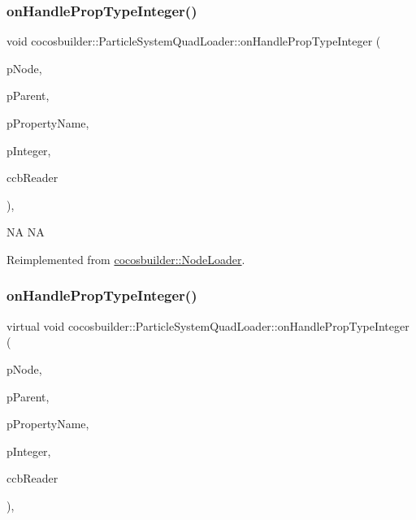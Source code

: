 \subsubsection{\texorpdfstring{on\+Handle\+Prop\+Type\+Integer()}{onHandlePropTypeInteger()}\hspace{0.1cm}{\footnotesize\ttfamily [1/2]}}
{\footnotesize\ttfamily void cocosbuilder\+::\+Particle\+System\+Quad\+Loader\+::on\+Handle\+Prop\+Type\+Integer (\begin{DoxyParamCaption}\item[{cocos2d\+::\+Node $\ast$}]{p\+Node,  }\item[{cocos2d\+::\+Node $\ast$}]{p\+Parent,  }\item[{const char $\ast$}]{p\+Property\+Name,  }\item[{int}]{p\+Integer,  }\item[{\hyperlink{classcocosbuilder_1_1CCBReader}{C\+C\+B\+Reader} $\ast$}]{ccb\+Reader }\end{DoxyParamCaption})\hspace{0.3cm}{\ttfamily [protected]}, {\ttfamily [virtual]}}

NA  NA 

Reimplemented from \hyperlink{classcocosbuilder_1_1NodeLoader}{cocosbuilder\+::\+Node\+Loader}.

\mbox{\label{classcocosbuilder_1_1ParticleSystemQuadLoader_a250882ee759f89e1211db8bab109fbc9}} 
\subsubsection{\texorpdfstring{on\+Handle\+Prop\+Type\+Integer()}{onHandlePropTypeInteger()}\hspace{0.1cm}{\footnotesize\ttfamily [2/2]}}
{\footnotesize\ttfamily virtual void cocosbuilder\+::\+Particle\+System\+Quad\+Loader\+::on\+Handle\+Prop\+Type\+Integer (\begin{DoxyParamCaption}\item[{cocos2d\+::\+Node $\ast$}]{p\+Node,  }\item[{cocos2d\+::\+Node $\ast$}]{p\+Parent,  }\item[{const char $\ast$}]{p\+Property\+Name,  }\item[{int}]{p\+Integer,  }\item[{\hyperlink{classcocosbuilder_1_1CCBReader}{C\+C\+B\+Reader} $\ast$}]{ccb\+Reader }\end{DoxyParamCaption})\hspace{0.3cm}{\ttfamily [protected]}, {\ttfamily [virtual]}}

